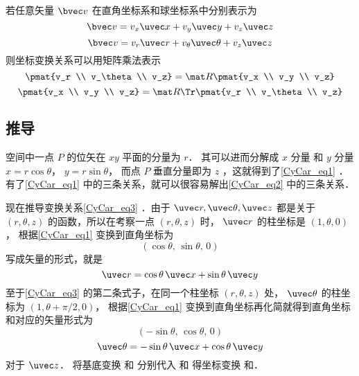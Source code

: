 若任意矢量 $\bvec v$ 在直角坐标系和球坐标系中分别表示为
\begin{equation}
\bvec v = v_x \uvec x + v_y \uvec y + v_z \uvec z
\end{equation}
\begin{equation}
\bvec v = v_r \uvec r + v_\theta \uvec \theta + v_z \uvec z
\end{equation}
则坐标变换关系可以用矩阵乘法表示
\begin{equation}
\pmat{v_r \\ v_\theta \\ v_z}
= \mat R \pmat{v_x \\ v_y \\ v_z}
\end{equation}
\begin{equation}
\pmat{v_x \\ v_y \\ v_z}
= \mat R\Tr \pmat{v_r \\ v_\theta \\ v_z}
\end{equation}
\subsection{推导}
空间中一点 $P$ 的位矢在 $xy$ 平面的分量为 $r$． 其可以进而分解成 $x$ 分量 和 $y$ 分量  $x = r\cos \theta$，  $y = r\sin \theta$， 而点 $P$ 垂直分量即为 $z$ ，这就得到了\autoref{CyCar_eq1} ．有了\autoref{CyCar_eq1} 中的三条关系，就可以很容易解出\autoref{CyCar_eq2} 中的三条关系．

现在推导变换关系\autoref{CyCar_eq3} ．由于 $\uvec r,\uvec \theta ,\uvec z $ 都是关于 $(r, \theta, z)$ 的函数，所以在考察一点 $(r, \theta, z)$ 时， $\uvec r$ 的柱坐标是 $(1, \theta, 0)$，  根据\autoref{CyCar_eq1} 变换到直角坐标为
\begin{equation}
(\cos \theta,\,\sin \theta,\,0)
\end{equation}
写成矢量的形式，就是
 \begin{equation}
\uvec r = \cos \theta \,\uvec x + \sin \theta \,\uvec y 
\end{equation}
至于\autoref{CyCar_eq3} 的第二条式子，在同一个柱坐标 $(r,\theta ,z)$ 处， $\uvec \theta $ 的柱坐标为 $(1, \theta + \pi /2, 0)$， 根据\autoref{CyCar_eq1} 变换到直角坐标再化简就得到直角坐标和对应的矢量形式为
\begin{equation}
(-\sin \theta ,\,\cos \theta , \,0)
\end{equation}
\begin{equation}
\uvec \theta  = -\sin \theta  \,\uvec x + \cos \theta \,\uvec y
\end{equation}
对于 $\uvec z$． 将基底变换 和 分别代入 和 得坐标变换 和．
